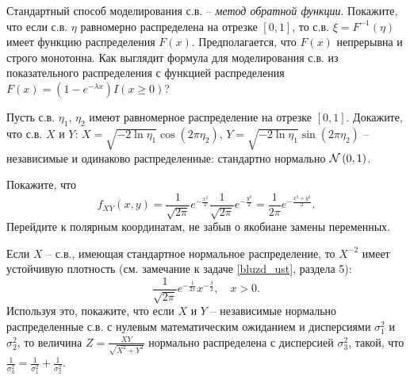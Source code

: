 \begin{problem}Стандартный способ моделирования с.в. -- {\it метод обратной функции}. Покажите, что если с.в. $\eta $ равномерно распределена на отрезке $\left[0,1\right]$, то с.в. $\xi =F^{-1} \left(\eta \right)$ имеет функцию распределения $F\left(x\right)$. Предполагается, что $F\left(x\right)$ непрерывна и строго монотонна. Как выглядит формула для моделирования с.в. из показательного распределения с функцией распределения $F\left(x\right)=\left(1-e^{-\lambda x} \right)I\left(x\geq 0\right)$?
\end{problem}

\begin{problem}
Пусть с.в. $\eta _{1} $, $\eta _{2} $ имеют равномерное распределение на отрезке $\left[0,1\right]$. Докажите, что с.в. $X$ и $Y$: $X=\sqrt{-2\ln \eta _{1} } \cos \left(2\pi \eta _{2} \right)$, $Y=\sqrt{-2\ln \eta _{1} } \sin \left(2\pi \eta _{2} \right)$ -- независимые и одинаково распределенные: стандартно нормально ${\rm {\mathcal N}}\left(0,1\right)$.

\begin{ordre}
Покажите, что
\[f_{XY} (x,y)=\frac{1}{\sqrt{2\pi } } e^{-\frac{x^{2} }{2} } \frac{1}{\sqrt{2\pi } } e^{-\frac{y^{2} }{2} } =\frac{1}{2\pi } e^{-\frac{x^{2} +y^{2} }{2} } .\] 
Перейдите к полярным координатам, не забыв о якобиане замены переменных.
\end{ordre}

\end{problem}


\begin{problem}

Если $X$ -- с.в., имеющая стандартное нормальное распределение, то $X^{-2} $ имеет устойчивую плотность (см. замечание к задаче \ref{bluzd_ust}, раздела 5):
\[\frac{1}{\sqrt{2\pi } } e^{-\frac{1}{2x} } x^{-\frac{3}{2} }, \quad x>0.\] 
Используя это, покажите, что если $X$ и $Y$ -- независимые нормально распределенные с.в. с нулевым математическим ожиданием и дисперсиями $\sigma _{1}^{2} $ и $\sigma _{2}^{2} $, то величина $Z=\frac{XY}{\sqrt{X^{2} +Y^{2} } } $ нормально распределена с дисперсией $\sigma _{3}^{2} $, такой, что $\frac{1}{\sigma _{3}^{2} } =\frac{1}{\sigma _{1}^{2} } +\frac{1}{\sigma _{2}^{2} } $.

\end{problem}


